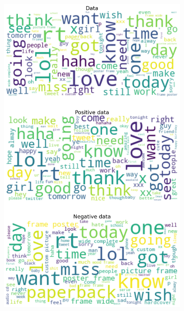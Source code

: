 \documentclass{article}
\begin{document}
\begin{itemize}
\begin{figure}[H]
\begin{subfigure}[b]{0.24\textwidth}
      \includegraphics[width=\textwidth]{chapter-06/section-01-01/07/visualization/3/wordcloud.png}
    \end{subfigure}
    \begin{subfigure}[b]{0.24\textwidth}
      \centering

\end{subfigure}
\end{figure}
\end{itemize}
\end{document}
